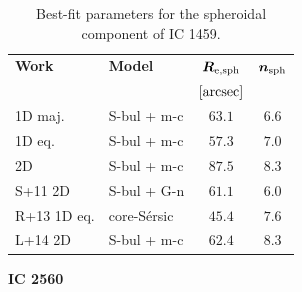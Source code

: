 \documentclass[preprint2]{emulateapj}
\begin{document}
  \begin{table}[h]
  \small
  \caption{Best-fit parameters for the spheroidal component of IC 1459.}
  \begin{center}
  \begin{tabular}{llcc}
  \hline
  {\bf Work} & {\bf Model}   & $\bm R_{\rm e,sph}$    & $\bm n_{\rm sph}$ \\
    &  &  $[\rm arcsec]$ & \\
  \hline
  1D maj. & S-bul + m-c & $63.1$  &  $6.6$ \\
  1D eq.  & S-bul + m-c & $57.3$  &  $7.0$ \\
  2D      & S-bul + m-c & $87.5$  &  $8.3$ \\
  \hline
  S+11 2D         & S-bul + G-n   & $61.1$  &  $6.0$ \\
  R+13 1D eq.         & core-S\'ersic & $45.4$  &  $7.6$ \\
  L+14 2D         & S-bul + m-c   & $62.4$  &  $8.3$ \\
  \hline
  \end{tabular}
  \end{center}
  \label{tab:ic1459}
  \end{table}

  \clearpage\newpage\noindent
  {\bf IC 2560 \\}
\end{document}
